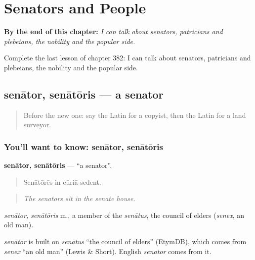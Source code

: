 
\chapter{Senators and People}
\label{ch:la-senators-and-people}

\begin{chapteropening}
\textbf{By the end of this chapter:} \emph{I can talk about senators, patricians and plebeians, the nobility and the popular side.}

Complete the last lesson of chapter 382: I can talk about senators, patricians and plebeians, the nobility and the popular side.
\end{chapteropening}

\section[senātor, senātōris]{senātor, senātōris — a senator}

\label{lesson:LA-C382-senator}



\begin{quote}
Before the new one: say the Latin for a copyist, then the Latin for a land surveyor.
\end{quote}

\subsection*{You'll want to know: senātor, senātōris}
\textbf{senātor, senātōris} — \textquotedblleft{}a senator\textquotedblright{}.

\begin{quote}
Senātōrēs in cūriā sedent.
\end{quote}

\begin{quote}
\emph{The senators sit in the senate house.}
\end{quote}

\emph{senātor, senātōris} m., a member of the \emph{senātus}, the council of elders (\emph{senex}, an old man).

\begin{cousinweb}
\emph{senātor} is built on \emph{senātus} \textquotedblleft{}the council of elders\textquotedblright{} (EtymDB), which comes from \emph{senex} \textquotedblleft{}an old man\textquotedblright{} (Lewis \& Short). English \emph{senator} comes from it.
\end{cousinweb}

